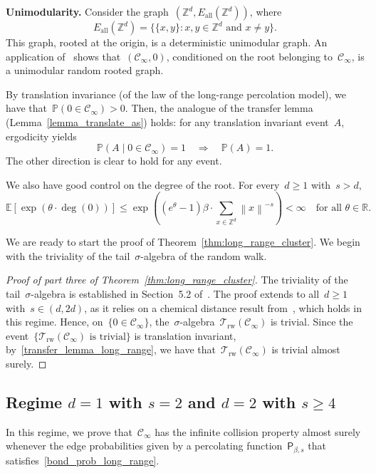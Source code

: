 \documentclass[a4paper,11pt]{article}
\newcommand{\EE}{\mathbb{E}}
\newcommand{\PP}{\mathbb{P}}
\newcommand{\RR}{\mathbb{R}}
\newcommand{\ZZ}{\mathbb{Z}}
\newcommand\norm[1]{\left\lVert#1\right\rVert}
\theoremstyle{definition}
\begin{document}
\noindent \textbf{Unimodularity.} Consider the graph~$(\ZZ^d,E_\mathrm{all}(\ZZ^d))$, where
$$ E_\mathrm{all}(\ZZ^d) = \{ \{x,y\}: x,y \in \ZZ^d \text{ and } x \neq y \}.$$
This graph, rooted at the origin, is a deterministic unimodular graph. An application of~\cite[Example~9.4]{AldousLyons2007} shows that~$(\mathcal C_\infty,0)$, conditioned on the root belonging to~$\mathcal C_\infty$, is a unimodular random rooted graph.

By translation invariance (of the law of the long-range percolation model), we have that~$\PP(0 \in \mathcal C_\infty) > 0$. Then, the analogue of the transfer lemma (Lemma~\ref{lemma_translate_as}) holds: for any translation invariant event~$A$, ergodicity yields
\begin{equation}\label{transfer_lemma_long_range}
\PP(A \mid 0 \in \mathcal C_\infty) = 1 \quad \Longrightarrow \quad \PP(A) = 1.
\end{equation}
The other direction is clear to hold for any event. 

We also have good control on the degree of the root. For every~$d \ge 1$ with~$s > d$,
\begin{equation}\label{root_long_range_percolation}
\EE[ \exp(\theta \cdot \deg(0) ) ] \leq \exp \left( (e^\theta-1)\beta \cdot \sum_{x \in \ZZ^d} \norm{x}^{-s} \right) < \infty \quad \text{for all } \theta \in \RR.
\end{equation}

We are ready to start the proof of Theorem~\ref{thm:long_range_cluster}. We begin with the triviality of the tail~$\sigma$-algebra of the random walk. 
\begin{proof}[Proof of part three of Theorem~\ref{thm:long_range_cluster}]
The triviality of the tail~$\sigma$-algebra is established in Section~5.2 of~\cite{BenjaminiCurien2012}. The proof extends to all~$d \ge 1$ with~$s \in (d,2d)$, as it relies on a chemical distance result from~\cite[Theorem~3.1]{Biskup11}, which holds in this regime. Hence, on~$\{0 \in \mathcal C_\infty\}$, the~$\sigma$-algebra~$\mathcal T_\mathrm{rw}(\mathcal C_\infty)$ is trivial. Since the event~$\{ \mathcal T_\mathrm{rw}( \mathcal C_\infty) \text{ is trivial} \}$ is translation invariant, by~\eqref{transfer_lemma_long_range}, we have that~$\mathcal T_\mathrm{rw}(\mathcal C_\infty)$ is trivial almost surely.

\end{proof}


\subsection{Regime $d=1$ with $s = 2$ and $d=2$ with $s \ge 4$}\label{ss_reg_long_rec}
In this regime, we prove that~$\mathcal C_\infty$ has the infinite collision property almost surely whenever the edge probabilities given by a percolating function~$\mathsf P_{\beta,s}$ that satisfies~\eqref{bond_prob_long_range}.
\end{document}
